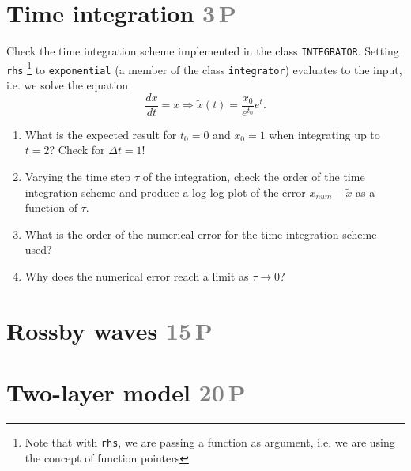 \documentclass[jobname=project, 10pt]{article}
\newcommand{\task}[2]{\section{#1 \hfill \normalsize\normalfont \textcolor{gray}{#2\,P}}\addtocounter{ptot}{#2}}
\newcounter{ptot}
\begin{document}
\task{Time integration}{3} 
Check the time integration scheme implemented in the class \texttt{INTEGRATOR}. Setting \texttt{rhs} \footnote{Note that with \texttt{rhs}, we are passing a function as argument, i.e. we are using the concept of function pointers} to \texttt{exponential} (a member of the class \texttt{integrator}) evaluates to the input, i.e. we solve the equation
\[\frac{d x}{d t} = x \Rightarrow \tilde{x}(t) = \frac{x_0}{e^{t_0}} e^t. \]

\begin{enumerate}[label=\alph*)]
\item What is the expected result  for $t_0=0$ and $x_0=1$ when integrating up to $t=2$? Check for $\Delta t=1$!
\item Varying the time step $\tau$ of the integration, check the order of the time integration scheme
  and produce a log-log plot of the error $x_{num} - \tilde{x}$ as a function of $\tau$.
\item What is the order of the numerical error for the time integration scheme used?
\item Why does the numerical error reach a limit as $\tau \rightarrow 0$? 
\end{enumerate}

\task{Rossby waves}{15}


\task{Two-layer model}{20} 
\end{document}
